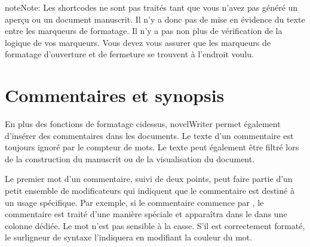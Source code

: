 \documentclass[a4paper,11pt,french]{sphinxmanual}
\begin{document}
\begin{sphinxadmonition}{note}{Note:}
\sphinxAtStartPar
Les shortcodes ne sont pas traités tant que vous n’avez pas généré un aperçu ou un document manuscrit. Il n’y a donc pas de mise en évidence du texte entre les marqueurs de formatage. Il n’y a pas non plus de vérification de la logique de vos marqueurs. Vous devez vous assurer que les marqueurs de formatage d’ouverture et de fermeture se trouvent à l’endroit voulu.
\end{sphinxadmonition}

\sphinxAtStartPar
{}


\section{Commentaires et synopsis}
\label{\detokenize{usage_format:comments-and-synopsis}}\label{\detokenize{usage_format:a-fmt-comm}}
\sphinxAtStartPar
En plus des fonctions de formatage ci\sphinxhyphen{}dessus, novelWriter permet également d’insérer des commentaires dans les documents. Le texte d’un commentaire est toujours ignoré par le compteur de mots. Le texte peut également être filtré lors de la construction du manuscrit ou de la visualisation du document.

\sphinxAtStartPar
Le premier mot d’un commentaire, suivi de deux points, peut faire partie d’un petit ensemble de modificateurs qui indiquent que le commentaire est destiné à un usage spécifique. Par exemple, si le commentaire commence par , le commentaire est traité d’une manière spéciale et apparaîtra dans le {\hyperref[\detokenize{usage_project:a-ui-outline}]{}} dans une colonne dédiée. Le mot  n’est pas sensible à la casse. S’il est correctement formaté, le surligneur de syntaxe l’indiquera en modifiant la couleur du mot.
\end{document}
